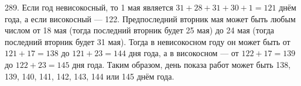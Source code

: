289. Если год невисокосный, то 1 мая является $31+28+31+30+1=121$ днём года, а если високосный --- 122. Предпоследний вторник мая может быть любым числом от 18 мая (тогда последний вторник будет 25 мая) до 24 мая (тогда последний вторник будет 31 мая). Тогда в невисокосном году он может быть от $121+17=138$ до $121+23=144$ дня года, а в високосном --- от $122+17=139$ до $122+23=145$ дня года. Таким образом, день показа работ может быть 138, 139, 140, 141, 142, 143, 144 или 145 днём года.\\
